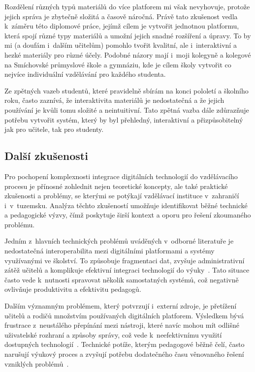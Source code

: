 Rozdělení různých typů materiálů do více platforem mi však nevyhovuje, protože jejich správa je zbytečně složitá a časově náročná.
Právě tato zkušenost vedla k~záměru této diplomové práce, jejímž cílem je vytvořit jednotnou platformu, která spojí různé typy materiálů a umožní jejich snadné rozšíření a úpravy.
To by mi (a doufám i~dalším učitelům) pomohlo tvořit kvalitní, ale i~interaktivní a hezké materiály pro různé účely.
Podobné názory mají i~moji kolegyně a kolegové na Smíchovské průmyslové škole a gymnáziu, kde je cílem školy vytvořit co nejvíce individuální vzdělávání pro každého studenta.

Ze zpětných vazeb studentů, které pravidelně sbírám na konci pololetí a školního roku, často zaznívá, že interaktivita materiálů je nedostatečná a že jejich používání je kvůli tomu složité a neintuitivní.
Tato zpětná vazba dále zdůrazňuje potřebu vytvořit systém, který by byl přehledný, interaktivní a přizpůsobitelný jak pro učitele, tak pro studenty.

\subsection{Další zkušenosti}

Pro pochopení komplexnosti integrace digitálních technologií do vzdělávacího procesu je přínosné zohlednit nejen teoretické koncepty, ale také praktické zkušenosti a problémy, se kterými se potýkají vzdělávací instituce v~zahraničí i~v~tuzemsku. 
Analýza těchto zkušeností umožňuje identifikovat běžné technické a pedagogické výzvy, čímž poskytuje širší kontext a oporu pro řešení zkoumaného problému.

Jedním z~hlavních technických problémů uváděných v~odborné literatuře je nedostatečná interoperabilita mezi digitálními platformami a systémy využívanými ve školství. 
To způsobuje fragmentaci dat, zvyšuje administrativní zátěž učitelů a komplikuje efektivní integraci technologií do výuky~\cite{powerschool2023}. 
Tato situace často vede k~nutnosti spravovat několik samostatných systémů, což negativně ovlivňuje produktivitu a efektivitu pedagogů.

Dalším významným problémem, který potvrzují i~externí zdroje, je přetížení učitelů a rodičů množstvím používaných digitálních platforem. 
Výsledkem bývá frustrace z~neustálého přepínání mezi nástroji, které navíc mohou mít odlišné uživatelské rozhraní a způsoby správy, což vede k~neefektivnímu využití dostupných technologií~\cite{guardian2025}. 
Technické potíže, kterým pedagogové běžně čelí, často narušují výukový proces a zvyšují potřebu dodatečného času věnovaného řešení vzniklých problémů~\cite{reddit2023}.

